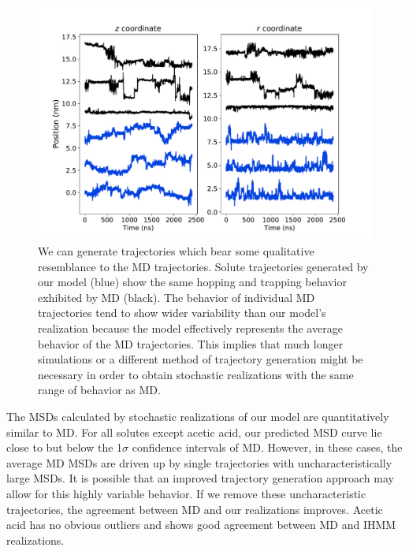 \documentclass{article}
\begin{document}
  \begin{figure}
  \centering
  \includegraphics[width=\textwidth]{trajectory_realizations_MET.pdf}
 \caption{We can generate trajectories which bear some qualitative resemblance to the MD 
  trajectories. Solute trajectories generated by our model (blue) show the same
  hopping and trapping behavior exhibited by MD (black). The behavior of individual 
  MD trajectories tend to show wider variability than our model's realization because
  the model effectively represents the average behavior of the MD trajectories. This 
  implies that much longer simulations or a different method of trajectory generation might
  be necessary in order to obtain stochastic realizations with the same range of behavior
  as MD.
   }\label{fig:trajectory_realizations_MET}
  \end{figure}
  
  The MSDs calculated by stochastic realizations of our model are quantitatively similar to
  MD. For all solutes except acetic acid, our predicted MSD curve lie close to but below the
  1$\sigma$ confidence intervals of MD. However, in these cases, the average MD MSDs are 
  driven up by single trajectories with uncharacteristically large MSDs. It is possible that
  an improved trajectory generation approach may allow for this highly variable behavior.
  If we remove these uncharacteristic trajectories, the agreement between MD and our realizations
  improves. Acetic acid has no obvious outliers and shows good agreement between MD and
  IHMM realizations.
  
\end{document}
